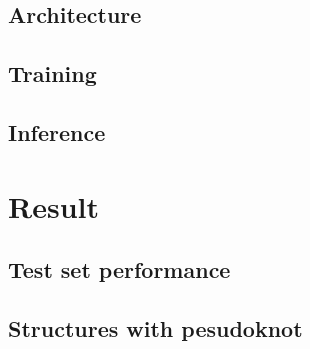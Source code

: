\documentclass{article}
\begin{document}
\subsection{Architecture}


\subsection{Training}



\subsection{Inference} \label{sec:inference}



\section{Result}

\subsection{Test set performance}


\subsection{Structures with pesudoknot}





%
%
%
\end{document}
